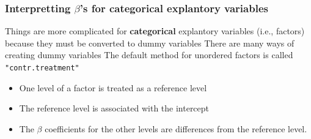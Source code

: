 \documentclass[color=usenames,dvipsnames]{beamer}\usepackage[]{graphicx}\usepackage[]{color}
\newcommand{\inr}[1]{\colorbox{inlinecolor}{\texttt{#1}}}
\begin{document}
\begin{frame}
  \frametitle{\small Interpretting $\beta$'s for categorical explantory
    variables}
  Things are more complicated for {\bf categorical} explantory
  variables (i.e., factors) because they must be converted to dummy
  variables
  \pause
  \vfill
  There are many ways of creating dummy variables
  \pause
  \vfill
  The default method for unordered factors is called \inr{"contr.treatment"}
  \begin{itemize}
    \item One level of a factor is treated as a reference level
    \item The reference level is associated with the intercept
    \item The $\beta$ coefficients for the other levels
      are differences from the reference level.
  \end{itemize}
\end{frame}














\end{document}
